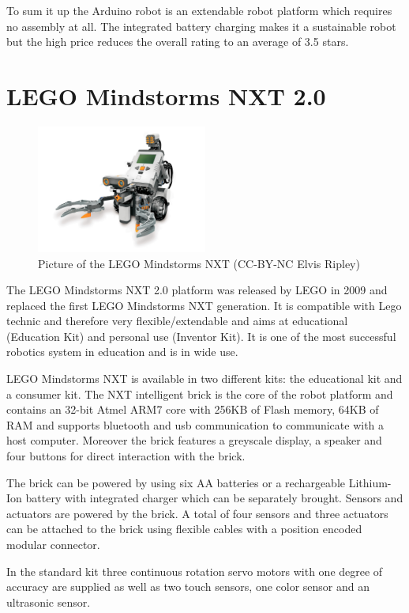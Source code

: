 To sum it up the Arduino robot is an extendable robot platform which requires no assembly at all. The integrated battery charging makes it a sustainable robot but the high price reduces the overall rating to an average of 3.5 stars.

\section{LEGO Mindstorms NXT 2.0}
\begin{figure}[H]
  \centering
  \includegraphics[width=0.5\textwidth]{images/mindstorms.jpg}
  \caption{Picture of the LEGO Mindstorms NXT (CC-BY-NC Elvis Ripley)}
\end{figure}

The LEGO Mindstorms NXT 2.0 platform was released by LEGO in 2009 and replaced the first LEGO Mindstorms NXT generation. It is compatible with Lego technic and therefore very flexible/extendable and aims at educational (Education Kit) and personal use (Inventor Kit). It is one of the most successful robotics system in education and is in wide use.

LEGO Mindstorms NXT is available in two different kits: the educational kit and a consumer kit. The NXT intelligent brick is the core of the robot platform and contains an 32-bit Atmel ARM7 core with 256KB of Flash memory, 64KB of RAM and supports bluetooth and usb communication to communicate with a host computer. Moreover the brick features a greyscale display, a speaker and four buttons for direct interaction with the brick.

The brick can be powered by using six AA batteries or a rechargeable Lithium-Ion battery with integrated charger which can be separately brought. Sensors and actuators are powered by the brick. A total of four sensors and three actuators can be attached to the brick using flexible cables with a position encoded modular connector.

In the standard kit three continuous rotation servo motors with one degree of accuracy are supplied as well as two touch sensors, one color sensor and an ultrasonic sensor. 

